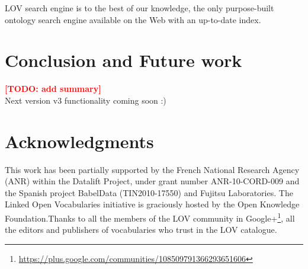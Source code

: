 \documentclass{iosart2c}
\newcommand{\TODO}[1]{\textcolor{red}{\textbf{[TODO:#1]}}}
\begin{document}
LOV search engine is to the best of our knowledge, the only purpose-built ontology search engine available on the Web with an up-to-date index.

\section{Conclusion and Future work}
\label{sec:conclusion}
\TODO{ add summary} \\
Next version v3 functionality coming soon :)

\section*{Acknowledgments}
This work has been partially supported by the French National Research Agency (ANR) within the Datalift Project, under grant number ANR-10-CORD-009 and the Spanish project BabelData (TIN2010-17550) and Fujitsu Laboratories. The Linked Open Vocabularies initiative is graciously hosted by the Open Knowledge Foundation.Thanks to all the members of the LOV community in Google+\footnote{\url{https://plus.google.com/communities/108509791366293651606}}, all the editors and publishers of vocabularies who trust in the LOV catalogue. 




\end{document}
